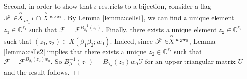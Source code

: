 \documentclass[10pt]{amsart}
\theoremstyle{plain}
\theoremstyle{definition}
\newtheorem{remark}[thm]{Remark}
\theoremstyle{remark}
\numberwithin{equation}{section}
\newcommand{\bC}{\mathbb{C}}
\newcommand{\cF}{\mathscr{F}}
\newcommand{\schub}{\buildrel\circ \over X}
\newcommand{\rich}[2]{\mathcal{R}^{\circ}\!(#2,#1)}
\begin{document}
 
 Second, in order to show that $\iota$ restricts to a bijection, consider a flag $\cF \in \schub_{w_{1}^{-1}}\cap \schub\!^{w_2w_0}$. By Lemma \ref{lemma:cells1}, we can find a unique element  $z_1 \in \bC^{\ell_{1}}$ such that $\cF = \cF^{B_{\beta_1}^{-1}(z_1)}$. Finally, there exists a unique element $z_2\in \bC^{\ell_{2}}$ such that $(z_1,z_2) \in X(\beta_1\beta_2; w_0)$. Indeed, since $\cF \in \schub\!^{w_2w_0}$, Lemma \ref{lemma:cells2} implies that there exists a unique $z_2 \in \bC^{\ell_{2}}$ such that $\cF = \cF^{B_{\beta_{2}}(z_2)w_{0}}$. So $B_{\beta_1}^{-1}(z_1) = B_{\beta_2}(z_2)w_0U$ for an upper triangular matrix $U$ and the result follows. \hfill$\Box$






\end{document}
